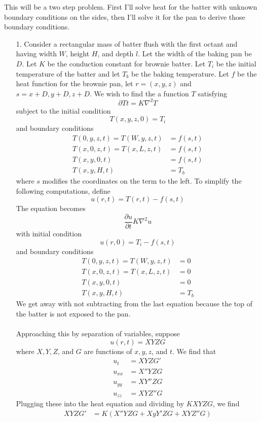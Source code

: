 \documentclass[11pt, fullpage]{article}
\begin{document}
This will be a two step problem.  First I'll solve heat for the batter with unknown boundary conditions on the sides, then I'll solve it for the pan to derive those boundary conditions.
\begin{enumerate}
\item[1.] Consider a rectangular mass of batter flush with the first octant and having width $W$, height $H$, and depth $l$.  Let the width of the baking pan be $D$.  Let $K$ be the conduction constant for brownie batter.  Let $T_i$ be the initial temperature of the batter and let $T_b$ be the baking temperature.  Let $f$ be the heat function for the brownie pan, let $r = (x,y,z)$ and $s = x+D,y+D,z+D$.   We wish to find the a function $T$ satisfying
\[\partial{T}{t} = K \nabla^2 T\]
subject to the initial condition
\[T(x,y,z,0) = T_i\]
and boundary conditions \begin{align*}
T(0,y,z,t) = T(W,y,z,t) &= f(s,t)\\
T(x,0,z,t) = T(x,L,z,t) &= f(s,t)\\
T(x,y,0,t) &= f(s,t)\\
T(x,y,H,t) &= T_b \end{align*}
where $s$ modifies the coordinates on the term to the left.
To simplify the following computations, define
\[u(r,t) = T(r,t) - f(s,t)\]
The equation becomes 
\[\frac{\partial u}{\partial t} K \nabla^2 u\]
with initial condition
\[u(r,0) = T_i - f(s,t)\]
and boundary conditions \begin{align*}
T(0,y,z,t) = T(W,y,z,t) &= 0\\
T(x,0,z,t) = T(x,L,z,t) &= 0\\
T(x,y,0,t) &= 0\\
T(x,y,H,t) &= T_b\end{align*}
We get away with not subtracting from the last equation because the top of the batter is not exposed to the pan.\\
\\
Approaching this by separation of variables, suppose
\[u(r,t) = XYZG\]
where $X,Y,Z$, and $G$ are functions of $x,y,z$, and $t$.  We find that \begin{align*}
u_t &= XYZG'\\
u_{xx} &= X''YZG\\
u_{yy} &= XY''ZG\\
u_{zz} &= XYZ''G \end{align*}
Plugging these into the heat equation and dividing by $KXYZG$, we find \begin{align*}
XYZG' &= K(X''YZG +XyY'ZG + XYZ''G)\\

\end{align*}
\end{enumerate}
\end{document}
